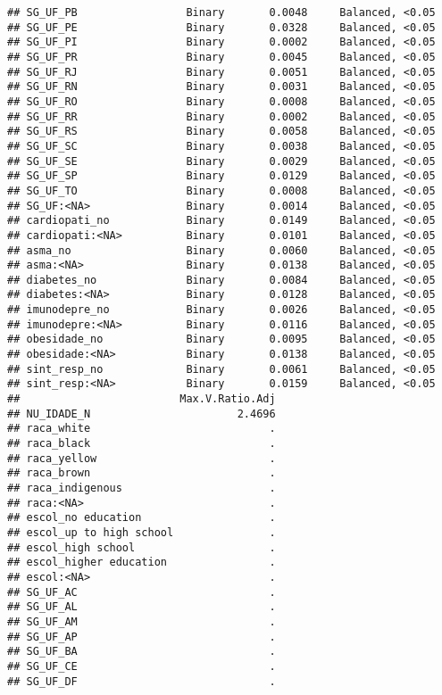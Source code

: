 \documentclass[
]{article}
\begin{document}
\begin{verbatim}
## SG_UF_PB                 Binary       0.0048     Balanced, <0.05
## SG_UF_PE                 Binary       0.0328     Balanced, <0.05
## SG_UF_PI                 Binary       0.0002     Balanced, <0.05
## SG_UF_PR                 Binary       0.0045     Balanced, <0.05
## SG_UF_RJ                 Binary       0.0051     Balanced, <0.05
## SG_UF_RN                 Binary       0.0031     Balanced, <0.05
## SG_UF_RO                 Binary       0.0008     Balanced, <0.05
## SG_UF_RR                 Binary       0.0002     Balanced, <0.05
## SG_UF_RS                 Binary       0.0058     Balanced, <0.05
## SG_UF_SC                 Binary       0.0038     Balanced, <0.05
## SG_UF_SE                 Binary       0.0029     Balanced, <0.05
## SG_UF_SP                 Binary       0.0129     Balanced, <0.05
## SG_UF_TO                 Binary       0.0008     Balanced, <0.05
## SG_UF:<NA>               Binary       0.0014     Balanced, <0.05
## cardiopati_no            Binary       0.0149     Balanced, <0.05
## cardiopati:<NA>          Binary       0.0101     Balanced, <0.05
## asma_no                  Binary       0.0060     Balanced, <0.05
## asma:<NA>                Binary       0.0138     Balanced, <0.05
## diabetes_no              Binary       0.0084     Balanced, <0.05
## diabetes:<NA>            Binary       0.0128     Balanced, <0.05
## imunodepre_no            Binary       0.0026     Balanced, <0.05
## imunodepre:<NA>          Binary       0.0116     Balanced, <0.05
## obesidade_no             Binary       0.0095     Balanced, <0.05
## obesidade:<NA>           Binary       0.0138     Balanced, <0.05
## sint_resp_no             Binary       0.0061     Balanced, <0.05
## sint_resp:<NA>           Binary       0.0159     Balanced, <0.05
##                         Max.V.Ratio.Adj
## NU_IDADE_N                       2.4696
## raca_white                            .
## raca_black                            .
## raca_yellow                           .
## raca_brown                            .
## raca_indigenous                       .
## raca:<NA>                             .
## escol_no education                    .
## escol_up to high school               .
## escol_high school                     .
## escol_higher education                .
## escol:<NA>                            .
## SG_UF_AC                              .
## SG_UF_AL                              .
## SG_UF_AM                              .
## SG_UF_AP                              .
## SG_UF_BA                              .
## SG_UF_CE                              .
## SG_UF_DF                              .

\end{verbatim}
\end{document}
